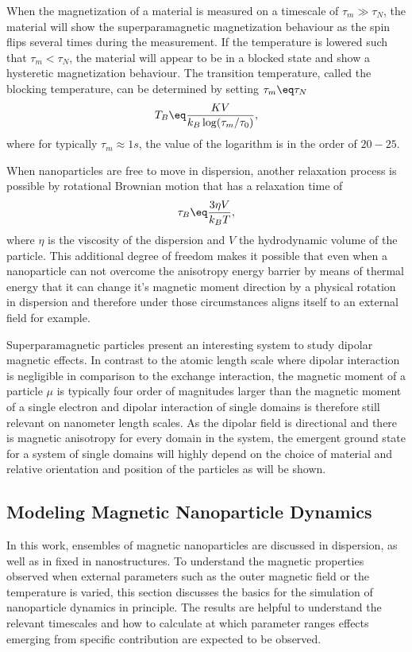 \documentclass[\main/dresen_thesis.tex]{subfiles}
\begin{document}
    When the magnetization of a material is measured on a timescale of $\tau_m \gg \tau_N$, the material will show the superparamagnetic magnetization behaviour as the spin flips several times during the measurement.
    If the temperature is lowered such that $\tau_m < \tau_N$, the material will appear to be in a blocked state and show a hysteretic magnetization behaviour.
    The transition temperature, called the blocking temperature, can be determined by setting $\tau_m \eq \tau_N$
    \begin{align}
      \label{eq:theoreticalBackground:superparamagnetism:blockingTemp}
      T_B \eq \frac{KV}{k_B \log(\tau_m/\tau_0)},
    \end{align}
    where for typically $\tau_m \approx 1 \unit{s}$, the value of the logarithm is in the order of $20 - 25$.

    When nanoparticles are free to move in dispersion, another relaxation process is possible by rotational Brownian motion that has a relaxation time of \cite{Einstein_1956_Inves}
    \begin{align}
      \tau_B \eq \frac{3 \eta V}{k_B T},
    \end{align}
    where $\eta$ is the viscosity of the dispersion and $V$ the hydrodynamic volume of the particle.
    This additional degree of freedom makes it possible that even when a nanoparticle can not overcome the anisotropy energy barrier by means of thermal energy that it can change it's magnetic moment direction by a physical rotation in dispersion and therefore under those circumstances aligns itself to an external field for example.

    Superparamagnetic particles present an interesting system to study dipolar magnetic effects.
    In contrast to the atomic length scale where dipolar interaction is negligible in comparison to the exchange interaction, the magnetic moment of a particle $\mu$ is typically four order of magnitudes larger than the magnetic moment of a single electron and dipolar interaction of single domains is therefore still relevant on nanometer length scales.
    As the dipolar field is directional and there is magnetic anisotropy for every domain in the system, the emergent ground state for a system of single domains will highly depend on the choice of material and relative orientation and position of the particles as will be shown.

  \subsection{Modeling Magnetic Nanoparticle Dynamics}
    In this work, ensembles of magnetic nanoparticles are discussed in dispersion, as well as in fixed in nanostructures.
    To understand the magnetic properties observed when external parameters such as the outer magnetic field or the temperature is varied, this section discusses the basics for the simulation of nanoparticle dynamics in principle.
    The results are helpful to understand the relevant timescales and how to calculate at which parameter ranges effects emerging from specific contribution are expected to be observed.
\end{document}
